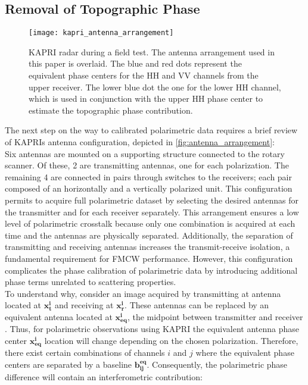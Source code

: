 \subsection{Removal of Topographic Phase}\label{sec:methods:topo_removal}
\begin{figure}[ht]
	\centering
	\texttt{[image: kapri\_antenna\_arrangement]}
	\caption{KAPRI radar during a field test. The antenna arrangement used in this paper is overlaid. The blue and red dots represent the equivalent phase centers for the  HH and VV channels from the upper receiver. The lower blue dot the one for the lower HH channel, which is used in conjunction with the upper HH phase center to estimate the topographic phase contribution.}
	\label{fig:antenna_arrangement}
\end{figure}
 The next step on the way to calibrated polarimetric data requires a brief review of KAPRIs antenna configuration, depicted in \autoref{fig:antenna_arrangement}:\\ Six antennas are mounted on a supporting structure connected to the rotary scanner. Of these, 2 are transmitting antennas, one for each polarization. The remaining 4 are connected in pairs through switches to the receivers; each pair composed of an horizontally and a vertically polarized unit. This configuration permits to acquire full polarimetric dataset by selecting the desired antennas for the transmitter and for each receiver separately. This arrangement ensures a low level of polarimetric crosstalk because only one combination is acquired at each time and the antennas are physically separated. Additionally, the separation of transmitting and receiving antennas increases the transmit-receive isolation, a fundamental requirement for FMCW performance\cite{Beasley1990,Stove1992, Strozzi2011}.  However, this configuration complicates the phase calibration of polarimetric data by introducing additional phase terms unrelated to scattering properties.\\
To understand why, consider an image acquired by transmitting at antenna located at $\mathbf{x_t^i}$ and receiving at $\mathbf{x_r^i}$. These antennas can be replaced by an equivalent antenna located at $\mathbf{x_{eq}^i}$, the midpoint between transmitter and receiver \cite{Pipia2009}. Thus, for polarimetric observations using  KAPRI the equivalent antenna phase center $\mathbf{x_{eq}^i}$ location will change depending on the chosen polarization. Therefore, there exist certain combinations of channels $i$ and $j$ where the equivalent phase centers are separated by a baseline $\mathbf{b_{ij}^{eq}}$. Consequently, the polarimetric phase difference   will contain an interferometric contribution:
